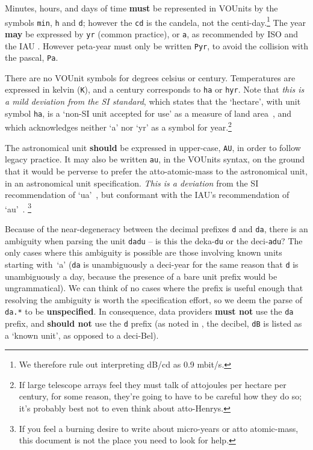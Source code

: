 \documentclass[11pt,notitlepage,onecolumn]{ivoa}
\makeatletter
\def\units{\@ifstar{\let\un@tsspace\relax    \un@ts}%
                   {\let\un@tsspace\thinspace\un@ts}}
\newcommand{\un@ts}[1]{{\let~\thinspace
  \ifmmode
    \un@tsspace\mathrm{#1}%
  \else
    \nobreak$\un@tsspace\mathrm{#1}$%
  \fi}}
\newcommand*\norm[1]{\textbf{\color{ivoacolor}#1}}
\newcommand{\unit}[1]{\texttt{\small\color{orange}#1}}
\makeatother
\begin{document}
Minutes, hours, and days of time \norm{must} be represented in VOUnits by the
symbols \unit{min}, \unit{h} and \unit{d}; however the \unit{cd} is
the candela, not the centi-day.\footnote{We therefore rule out
interpreting \units{dB/cd} as 0.9\units{mbit/s}.}  The year \norm{may} be expressed by
\unit{yr} (common practice),
or \unit{a},
as recommended by ISO \citep[Annex C]{std:iso80000-3}
and the IAU \citep[Table 6]{wilkins89}.
However peta-year must only be written \unit{Pyr},
to avoid the collision with the pascal, \unit{Pa}.

There are no VOUnit symbols for degrees celsius or century.
Temperatures are expressed in kelvin (\unit{K}),
and a century corresponds to \unit{ha} or \unit{hyr}.
Note that \emph{this is a mild deviation from the SI standard},
which states that the `hectare', with unit symbol \unit{ha},
is a `non-SI unit accepted for use' as a measure of land area~\citep[table~6]{si-brochure},
and which acknowledges neither `a' nor `yr' as a symbol for year.\footnote{If
large telescope arrays feel they must talk of attojoules per
hectare per century, for some reason, they're going to have to be
careful how they do so; it's probably best not to even think about atto-Henrys.}

The astronomical unit \norm{should} be expressed in upper-case, \unit{AU}, in
order to follow legacy practice.  It may also be written \unit{au}, in
the VOUnits syntax, on the ground that it would be perverse to prefer
the atto-atomic-mass to the astronomical unit, in an astronomical unit
specification.
\emph{This is a deviation} from the SI recommendation of
`ua'~\citep[Table 7]{si-brochure}, but conformant with the IAU's
recommendation of `au'~\citep{iau12}.%
\footnote{If you feel a burning desire to write about micro-years or
atto atomic-mass, this document is not the place you need to look
for help.}

Because of the near-degeneracy between the decimal prefixes \texttt{d}
and \texttt{da}, there is an ambiguity when parsing the
unit \unit{dadu} -- is this the deka-\unit{du} or the deci-\unit{adu}?
The only cases where this ambiguity is possible are those involving
known units starting with~`a' (\texttt{da} is unambiguously a
deci-year for the same reason that \texttt{d} is unambiguously a day,
because the presence of a bare unit prefix would be ungrammatical).
We can think of no cases where the prefix is useful enough that
resolving the ambiguity is worth the specification effort, so we deem
the parse of \texttt{da.*} to be \textbf{unspecified}. %
In consequence, data providers \norm{must not} use the \texttt{da}
prefix, and \norm{should not} use the \texttt d prefix (as noted
in , the decibel, \unit{dB} is listed as a `known
unit', as opposed to a deci-Bel).
\end{document}
